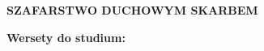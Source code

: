 \documentclass[10pt,a4paper,oneside]{article}
\begin{document}
\centerline{\textbf{\MakeUppercase{Szafarstwo duchowym skarbem}}}
\begin{center}
\textbf{Wersety do studium:} 
\end{center}
\end{document}
